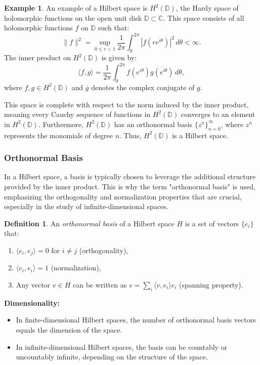 \documentclass[12pt, reqno]{amsart}
\theoremstyle{definition}
\newtheorem{definition}[theorem]{Definition}
\newtheorem{example}[theorem]{Example}
\numberwithin{equation}{section}
\begin{document}
\begin{example}
An example of a Hilbert space is \( H^2(\mathbb{D}) \), the Hardy space of holomorphic functions on the open unit disk \( \mathbb{D} \subset \mathbb{C} \). This space consists of all holomorphic functions \( f \) on \( \mathbb{D} \) such that:
\[
\|f\|^2 = \sup_{0 \leq r < 1} \frac{1}{2\pi} \int_0^{2\pi} |f(re^{i\theta})|^2 \, d\theta < \infty.
\]
The inner product on \( H^2(\mathbb{D}) \) is given by:
\[
\langle f, g \rangle = \frac{1}{2\pi} \int_0^{2\pi} f(e^{i\theta}) \overline{g(e^{i\theta})} \, d\theta,
\]
where \( f, g \in H^2(\mathbb{D}) \) and \( \overline{g} \) denotes the complex conjugate of \( g \).

This space is complete with respect to the norm induced by the inner product, meaning every Cauchy sequence of functions in \( H^2(\mathbb{D}) \) converges to an element in \( H^2(\mathbb{D}) \). Furthermore, \( H^2(\mathbb{D}) \) has an orthonormal basis \( \{z^n\}_{n=0}^\infty \), where \( z^n \) represents the monomials of degree \( n \). Thus, \( H^2(\mathbb{D}) \) is a Hilbert space.
\end{example}

\subsubsection{Orthonormal Basis}
In a Hilbert space, a basis is typically chosen to leverage the additional structure provided by the inner product. This is why the term "orthonormal basis" is used, emphasizing the orthogonality and normalization properties that are crucial, especially in the study of infinite-dimensional spaces.

\begin{definition}
An \textit{orthonormal basis} of a Hilbert space $H$ is a set of vectors $\{e_i\}$ that:
\begin{enumerate}
    \item $\langle e_i, e_j \rangle = 0$ for $i \neq j$ (orthogonality),
    \item $\langle e_i, e_i \rangle = 1$ (normalization),
    \item Any vector $v \in H$ can be written as $v = \sum_i \langle v, e_i \rangle e_i$ (spanning property).
\end{enumerate}
\end{definition}

\noindent \textbf{Dimensionality:}
\begin{itemize}
    \item In finite-dimensional Hilbert spaces, the number of orthonormal basis vectors equals the dimension of the space.
    \item In infinite-dimensional Hilbert spaces, the basis can be countably or uncountably infinite, depending on the structure of the space.
\end{itemize}
\end{document}
